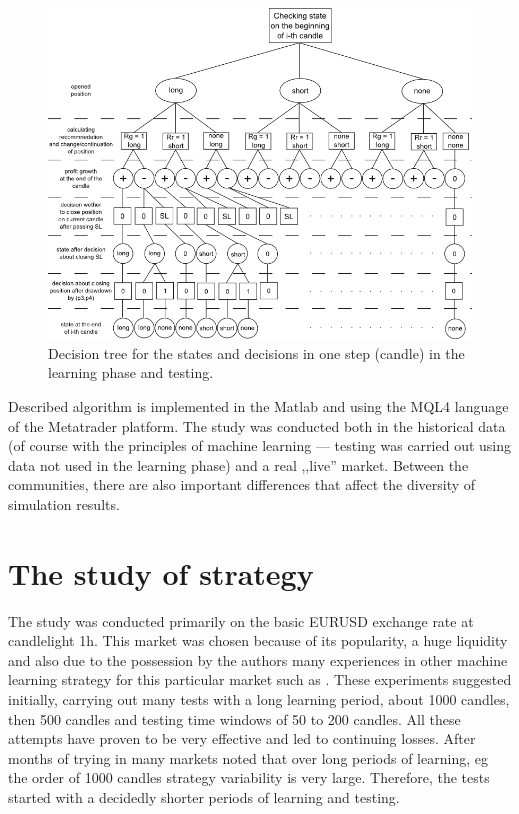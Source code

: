 \documentclass[runningheads,a4paper]{llncs}
\begin{document}
\begin{figure}[h!]
\centering
\includegraphics[width = \textwidth]{figures/rys7.png}
\caption{Decision tree for the states and decisions in one step (candle) in the learning phase and testing.}
\label{fig:fig7}
\end{figure}
\FloatBarrier

Described algorithm is implemented in the Matlab and using the MQL4 language of the Metatrader platform. The study was conducted both in the historical data (of course with the principles of machine learning --- testing was carried out using data not used in the learning phase) and a real ,,live'' market. Between the communities, there are also important differences that affect the diversity of simulation results.

\section{The study of strategy}
The study was conducted primarily on the basic EURUSD exchange rate at candlelight 1h. This market was chosen because of its popularity, a huge liquidity and also due to the possession by the authors many experiences in other machine learning strategy for this particular market such as \cite{Wilinski2014}. These experiments suggested initially, carrying out many tests with a long learning period, about 1000 candles, then 500 candles and testing time windows of 50 to 200 candles. All these attempts have proven to be very effective and led to continuing losses. After months of trying in many markets noted that over long periods of learning, eg the order of 1000 candles strategy variability is very large. Therefore, the tests started with a decidedly shorter periods of learning and testing.\\
\end{document}
